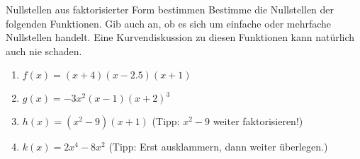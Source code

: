\begin{aufgabenumgebung}{Nullstellen aus faktorisierter Form bestimmen}
Bestimme die Nullstellen der folgenden Funktionen. Gib auch an, ob es sich um einfache oder mehrfache Nullstellen handelt. Eine Kurvendiskussion zu diesen Funktionen kann natürlich auch nie schaden.
\begin{enumerate}
    \item $f(x) = (x+4)(x-2.5)(x+1)$
    \item $g(x) = -3x^2(x-1)(x+2)^3$
    \item $h(x) = (x^2-9)(x+1)$ (Tipp: $x^2-9$ weiter faktorisieren!)
    \item $k(x) = 2x^4 - 8x^2$ (Tipp: Erst ausklammern, dann weiter überlegen.)
\end{enumerate}
\end{aufgabenumgebung}

